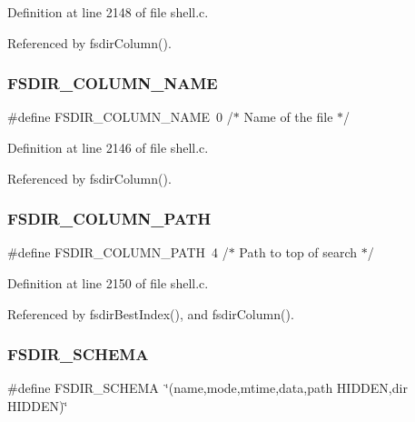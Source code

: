 Definition at line 2148 of file shell.\+c.



Referenced by fsdir\+Column().

\mbox{\label{shell_8c_addab4f473ecdf074e6784750852066a4}} 
\subsubsection{F\+S\+D\+I\+R\+\_\+\+C\+O\+L\+U\+M\+N\+\_\+\+N\+A\+ME}
{\footnotesize\ttfamily \#define F\+S\+D\+I\+R\+\_\+\+C\+O\+L\+U\+M\+N\+\_\+\+N\+A\+ME~0     /$\ast$ Name of the file $\ast$/}



Definition at line 2146 of file shell.\+c.



Referenced by fsdir\+Column().

\mbox{\label{shell_8c_a3446fd7d11604888c5b96e27c7b0fcd9}} 
\subsubsection{F\+S\+D\+I\+R\+\_\+\+C\+O\+L\+U\+M\+N\+\_\+\+P\+A\+TH}
{\footnotesize\ttfamily \#define F\+S\+D\+I\+R\+\_\+\+C\+O\+L\+U\+M\+N\+\_\+\+P\+A\+TH~4     /$\ast$ Path to top of search $\ast$/}



Definition at line 2150 of file shell.\+c.



Referenced by fsdir\+Best\+Index(), and fsdir\+Column().

\mbox{\label{shell_8c_a425fd0ff50effad5e469aec13296f46d}} 
\subsubsection{F\+S\+D\+I\+R\+\_\+\+S\+C\+H\+E\+MA}
{\footnotesize\ttfamily \#define F\+S\+D\+I\+R\+\_\+\+S\+C\+H\+E\+MA~\char`\"{}(name,mode,mtime,data,path H\+I\+D\+D\+EN,dir H\+I\+D\+D\+EN)\char`\"{}}



